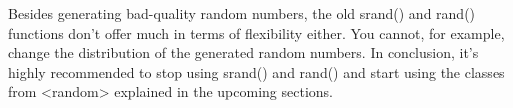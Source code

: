 Besides generating bad-quality random numbers, the old srand() and rand() functions don’t offer much in terms of flexibility either. You cannot, for example, change the distribution of the generated random numbers. In conclusion, it’s highly recommended to stop using srand() and rand() and start using the classes from <random> explained in the upcoming sections.















